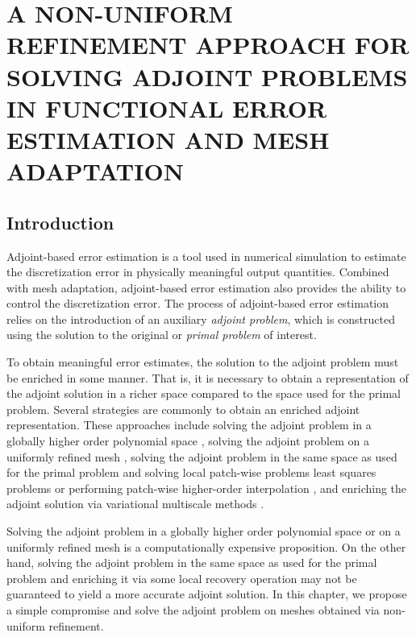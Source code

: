 \chapter{A NON-UNIFORM REFINEMENT APPROACH
FOR SOLVING ADJOINT PROBLEMS IN FUNCTIONAL
ERROR ESTIMATION AND MESH ADAPTATION}
\label{chap:refine}

\section{Introduction}

Adjoint-based error estimation
\cite{becker2001optimal, giles2003adjoint,
pierce2004adjoint, venditti2000adjoint,
venditti2002adjoint,
venditti2003adjoint,
prudhomme1999goal,
prudhomme2003practical,
fidkowski2011review,
connors2013method}
is a tool used in numerical simulation
to estimate the discretization error
in physically meaningful output quantities.
Combined with mesh adaptation, adjoint-based error
estimation also provides the ability to control the discretization
error. The process of adjoint-based error estimation
relies on the introduction of an auxiliary
\emph{adjoint problem}, which is constructed using
the solution to the original or \emph{primal problem}
of interest.

To obtain meaningful error estimates,
the solution to the adjoint problem must be
enriched in some manner. That is, it is
necessary to obtain a representation of the
adjoint solution in a richer space compared
to the space used for the primal problem.
Several strategies are commonly
to obtain an enriched adjoint representation.
These approaches include
solving the adjoint problem in a globally higher
order polynomial space
\cite{fidkowski2011output},
solving the adjoint problem on a uniformly
refined mesh \cite{burstedde2009parallel},
solving the adjoint problem in the same space
as used for the primal problem
and solving local patch-wise problems least
squares problems \cite{nemec2007adjoint} or
performing patch-wise higher-order interpolation
\cite{becker2001optimal},
and enriching the adjoint solution via
variational multiscale methods
\cite{granzow2017output}.

Solving the adjoint problem in a globally higher
order polynomial space or on a uniformly refined mesh
is a computationally expensive proposition. On the
other hand, solving the adjoint problem in the same
space as used for the primal problem and enriching
it via some local recovery operation may not be guaranteed
to yield a more accurate adjoint solution. In this
chapter, we propose a simple compromise and solve the
adjoint problem on meshes obtained via non-uniform
refinement.

